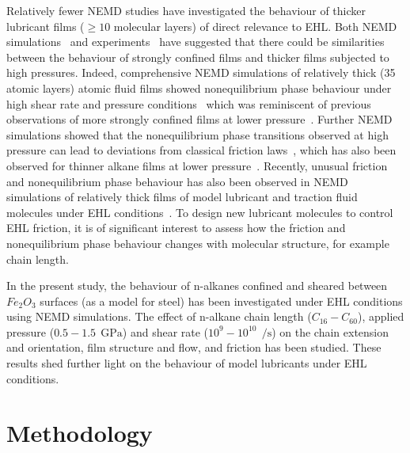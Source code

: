 \documentclass[5p]{elsarticle}
\begin{document}
Relatively fewer NEMD studies have investigated the behaviour of thicker lubricant films ($\geq 10$ molecular layers) of direct relevance to EHL. Both NEMD simulations~\cite{Thompson1992,Robbins1996} and experiments~\cite{VanAlsten1988} have suggested that there could be similarities between the behaviour of strongly confined films and thicker films subjected to high pressures. Indeed, comprehensive NEMD simulations of relatively thick (35 atomic layers) atomic fluid films showed nonequilibrium phase behaviour under high shear rate and pressure conditions~\cite{Heyes2012,Gattinoni2013} which was reminiscent of previous observations of more strongly confined films at lower pressure~\cite{Thompson1990}. Further NEMD simulations showed that the nonequilibrium phase transitions observed at high pressure can lead to deviations from classical friction laws~\cite{Mackowiak2016}, which has also been observed for thinner alkane films at lower pressure~\cite{Sivebaek2010}. Recently, unusual friction and nonequilibrium phase behaviour has also been observed in NEMD simulations of relatively thick films of model lubricant and traction fluid molecules under EHL conditions~\cite{Ewen2017a}. To design new lubricant molecules to control EHL friction, it is of significant interest to assess how the friction and nonequilibrium phase behaviour changes with molecular structure, for example chain length.

In the present study, the behaviour of n-alkanes confined and sheared between $Fe_2O_3$ surfaces (as a model for steel) has been investigated under EHL conditions using NEMD simulations. The effect of n-alkane chain length ($C_{16} - C_{60}$), applied pressure ($0.5 - 1.5~\SI{}{\giga\pascal}$) and shear rate ($10^{9} - 10^{10} ~\SI{}{\per\second}$) on the chain extension and orientation, film structure and flow, and friction has been studied. These results shed further light on the behaviour of model lubricants under EHL conditions.


\section{Methodology}
\label{method}
\end{document}

